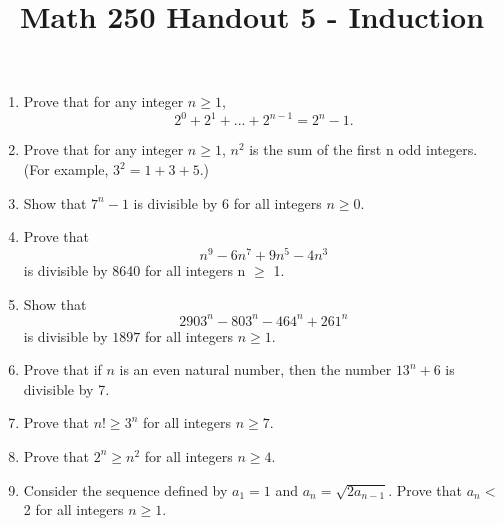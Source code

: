 \documentclass[12pt, reqno]{amsart}
\begin{document}
\title[Math 250 Handout 5 - Induction]{Math 250 Handout 5 - Induction}\maketitle

\begin{enumerate}

\item Prove that for any integer $n\geq 1$, $$2^0 +2^1 +...+2^{n-1} =2^{n}-1.$$

\item Prove that for any integer $n \geq 1$, $n^2$ is the sum of the first n odd integers. (For example, $3^2 =1+3+5$.)

\item Show that $7^n - 1$ is divisible by 6 for all integers $n \geq 0$.


\item Prove that $$n^9 - 6n^7 + 9n^5 - 4n^3$$ is divisible by 8640 for all integers n $\geq$ 1.




\item Show that 
\[
2903^n - 803^n - 464^n + 261^n
\]
is divisible by $1897$ for all integers $n \geq 1$.

\item Prove that if $n$ is an even natural number, then the number $13^n + 6$ is divisible by 7.


\item Prove that $n! \geq 3^n$ for all integers $n \geq 7$.

\item Prove that $2^n \geq n^2$ for all integers $n \geq 4$.

\item Consider the sequence defined by $a_1 = 1$ and $a_n = \sqrt{2 a_{n-1}}$. Prove that $a_n <$ 2 for all integers $n \geq 1$.


\end{enumerate}
\end{document}

